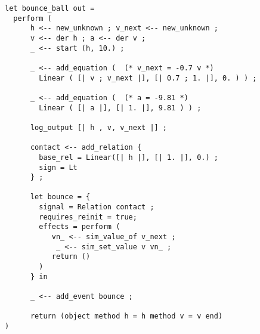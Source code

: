 \documentclass[preview]{standalone}
\begin{document}
\begin{lstlisting}
let bounce_ball out = 
  perform (
      h <-- new_unknown ; v_next <-- new_unknown ;      
      v <-- der h ; a <-- der v ;
      _ <-- start (h, 10.) ;
      
      _ <-- add_equation (  (* v_next = -0.7 v *)
        Linear ( [| v ; v_next |], [| 0.7 ; 1. |], 0. ) ) ;
      
      _ <-- add_equation (  (* a = -9.81 *)
        Linear ( [| a |], [| 1. |], 9.81 ) ) ;

      log_output [| h , v, v_next |] ;

      contact <-- add_relation { 
        base_rel = Linear([| h |], [| 1. |], 0.) ; 
        sign = Lt 
      } ;

      let bounce = {
        signal = Relation contact ;
        requires_reinit = true;
        effects = perform ( 
           vn_ <-- sim_value_of v_next ; 
            _ <-- sim_set_value v vn_ ;		      
           return () 
        )
      } in
      
      _ <-- add_event bounce ;

      return (object method h = h method v = v end)
)
\end{lstlisting}
\end{document}
